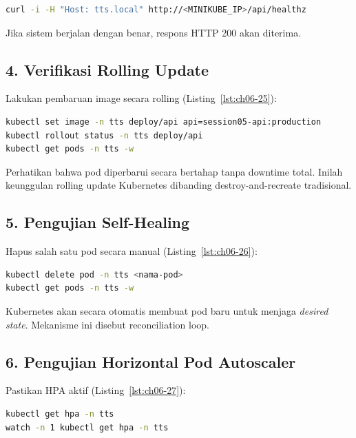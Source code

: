 \begin{lstlisting}[language=bash, caption={Menguji layanan dengan curl (3)}, label={lst:ch06-24}]
curl -i -H "Host: tts.local" http://<MINIKUBE_IP>/api/healthz
\end{lstlisting}

Jika sistem berjalan dengan benar, respons HTTP 200 akan diterima.

\subsection*{4. Verifikasi Rolling Update}

Lakukan pembaruan image secara rolling (Listing~\ref{lst:ch06-25}):

\begin{lstlisting}[language=bash, caption={Potongan kode pada 4. Verifikasi Rolling Update}, label={lst:ch06-25}]
kubectl set image -n tts deploy/api api=session05-api:production
kubectl rollout status -n tts deploy/api
kubectl get pods -n tts -w
\end{lstlisting}

Perhatikan bahwa pod diperbarui secara bertahap tanpa downtime total. Inilah keunggulan rolling update Kubernetes dibanding destroy-and-recreate tradisional.

\subsection*{5. Pengujian Self-Healing}

Hapus salah satu pod secara manual (Listing~\ref{lst:ch06-26}):

\begin{lstlisting}[language=bash, caption={Mengubah objek Kubernetes}, label={lst:ch06-26}]
kubectl delete pod -n tts <nama-pod>
kubectl get pods -n tts -w
\end{lstlisting}

Kubernetes akan secara otomatis membuat pod baru untuk menjaga \textit{desired state}. Mekanisme ini disebut reconciliation loop.

\subsection*{6. Pengujian Horizontal Pod Autoscaler}

Pastikan HPA aktif (Listing~\ref{lst:ch06-27}):

\begin{lstlisting}[language=bash, caption={Memeriksa objek Kubernetes (3)}, label={lst:ch06-27}]
kubectl get hpa -n tts
watch -n 1 kubectl get hpa -n tts
\end{lstlisting}

